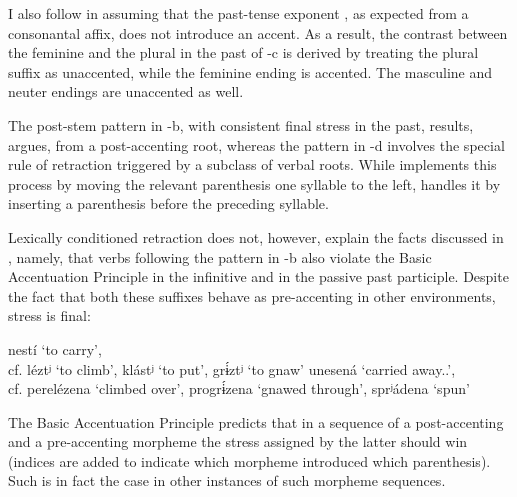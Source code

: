 \documentclass[output=paper,colorlinks,citecolor=black,koreanfont]{langscibook}
\begin{document}
I also follow \citeauthor{Melvold1989} in assuming that the past-tense exponent , as expected from a consonantal affix, does not introduce an accent. As a result, the contrast between the feminine and the plural in the past of -c is derived by treating the plural suffix  as unaccented, while the feminine ending  is accented. The masculine and neuter endings are unaccented as well.

The post-stem pattern in -b, with consistent final stress in the past, results, \citeauthor{Melvold1989} argues, from a post-accenting root, whereas the pattern in -d involves the special rule of retraction triggered by a subclass of verbal roots. While \citet{Melvold1989} implements this process by moving the relevant parenthesis one syllable to the left, \citet{Halle1997} handles it by inserting a parenthesis before the preceding syllable.

Lexically conditioned retraction does not, however, explain the facts discussed in \citet{Matushansky2024}, namely, that verbs following the pattern in -b also violate the Basic Accentuation Principle  in the infinitive and in the passive past participle. Despite the fact that both these suffixes behave as pre-accenting in other environments, stress is final:

\ea\label{mat:ex:nesti-unesena}
\ea\label{mat:ex:nesti} nestí ‘to carry’,\\
cf. léztʲ ‘to climb’, klástʲ ‘to put’, grɨ́ztʲ ‘to gnaw’
\ex\label{mat:ex:unesena} unesená ‘carried away.{\FEM.\SG}’,\\
cf. perelézena ‘climbed over’, progrɨ́zena ‘gnawed through’, sprʲádena ‘spun’
\z
\z

\noindent The Basic Accentuation Principle  predicts that in a sequence of a post-ac\-cent\-ing and a pre-accenting morpheme the stress assigned by the latter should win  (indices are added to indicate which morpheme introduced which parenthesis). Such is in fact the case in other instances of such morpheme sequences.\bigskip
\end{document}
